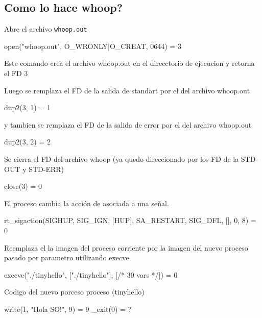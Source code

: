 \subsection{Como lo hace whoop?}

Abre el archivo \verb|whoop.out|\\
\begin{framed}
\begin{verbatimtab}
open("whoop.out", O_WRONLY|O_CREAT, 0644) = 3
\end{verbatimtab}
\end{framed}

Este comando crea el archivo whoop.out en el direcctorio de ejecucion y retorna el FD 3

Luego se remplaza el FD de la salida de standart por el del archivo whoop.out

\begin{framed}
\begin{verbatimtab}
dup2(3, 1)                  = 1
\end{verbatimtab}
\end{framed}

y tambien se remplaza el FD de la salida de error por el del archivo whoop.out\\
\begin{framed}
\begin{verbatimtab}
dup2(3, 2)                  = 2
\end{verbatimtab}
\end{framed}

Se cierra el FD del archivo whoop (ya quedo direccionado por los FD de la STD-OUT y STD-ERR)\\
\begin{framed}
\begin{verbatimtab}
close(3)                    = 0
\end{verbatimtab}
\end{framed}

El proceso cambia la acci\'on de asociada a una se\~nal.
\begin{framed}
\begin{verbatimtab}
rt_sigaction(SIGHUP, {SIG_IGN, [HUP], SA_RESTART}, {SIG_DFL, [], 0}, 8) = 0
\end{verbatimtab}
\end{framed}

Reemplaza el la imagen del proceso corriente por la imagen del nuevo proceso pasado por parametro utilizando execve
\begin{framed}
\begin{verbatimtab}
execve("./tinyhello", ["./tinyhello"], [/* 39 vars */]) = 0
\end{verbatimtab}
\end{framed}

Codigo del nuevo porceso proceso (tinyhello)
\begin{framed}
\begin{verbatimtab}
write(1, "Hola SO!\n", 9)   = 9
_exit(0)                    = ?
\end{verbatimtab}
\end{framed}
